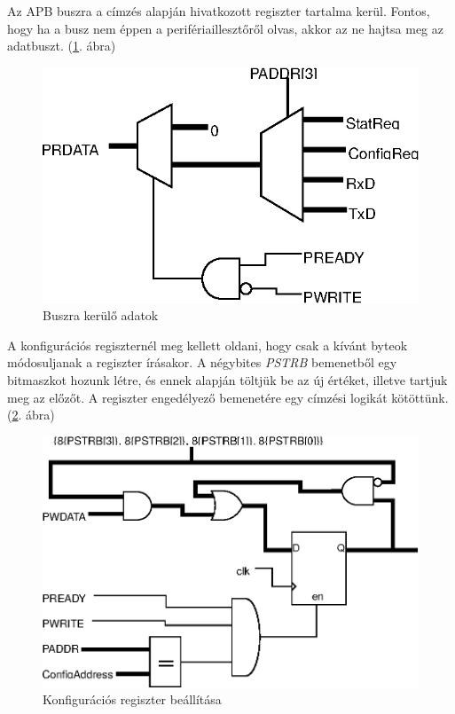 Az APB buszra a címzés alapján hivatkozott regiszter tartalma kerül. Fontos, hogy ha a busz nem éppen a perifériaillesztőről olvas, akkor az ne hajtsa meg az adatbuszt. (\ref{fig:bloc_prdata}. ábra)

\begin{figure}[h]
\vspace{0.5cm}
\begin{center}
\includegraphics{figures/bloc_prdata.eps}
\caption{Buszra kerülő adatok}
\label{fig:bloc_prdata}
\end{center}
\vspace{0.5cm}
\end{figure}

A konfigurációs regiszternél meg kellett oldani, hogy csak a kívánt byteok módosuljanak a regiszter írásakor. A négybites \textit{PSTRB} bemenetből egy bitmaszkot hozunk létre, és ennek alapján töltjük be az új értéket, illetve tartjuk meg az előzőt. A regiszter engedélyező bemenetére egy címzési logikát kötöttünk. (\ref{fig:bloc_configreg}. ábra)

\begin{figure}[h]
\vspace{0.5cm}
\begin{center}
\includegraphics{figures/bloc_configreg.eps}
\caption{Konfigurációs regiszter beállítása}
\label{fig:bloc_configreg}
\end{center}
\vspace{0.5cm}
\end{figure}
\clearpage
